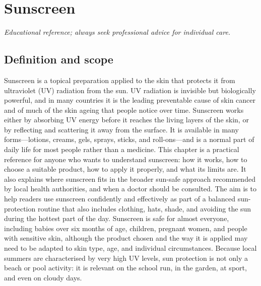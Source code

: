 \chapter{Sunscreen}

\medskip
\noindent\textit{Educational reference; always seek professional advice for individual care.}

\section*{Definition and scope}
Sunscreen is a topical preparation applied to the skin that protects it from ultraviolet (UV) radiation from the sun. UV radiation is invisible but biologically powerful, and in many countries it is the leading preventable cause of skin cancer and of much of the skin ageing that people notice over time. Sunscreen works either by absorbing UV energy before it reaches the living layers of the skin, or by reflecting and scattering it away from the surface. It is available in many forms---lotions, creams, gels, sprays, sticks, and roll-ons---and is a normal part of daily life for most people rather than a medicine. This chapter is a practical reference for anyone who wants to understand sunscreen: how it works, how to choose a suitable product, how to apply it properly, and what its limits are. It also explains where sunscreen fits in the broader sun-safe approach recommended by local health authorities, and when a doctor should be consulted. The aim is to help readers use sunscreen confidently and effectively as part of a balanced sun-protection routine that also includes clothing, hats, shade, and avoiding the sun during the hottest part of the day. Sunscreen is safe for almost everyone, including babies over six months of age, children, pregnant women, and people with sensitive skin, although the product chosen and the way it is applied may need to be adapted to skin type, age, and individual circumstances. Because local summers are characterised by very high UV levels, sun protection is not only a beach or pool activity: it is relevant on the school run, in the garden, at sport, and even on cloudy days.


